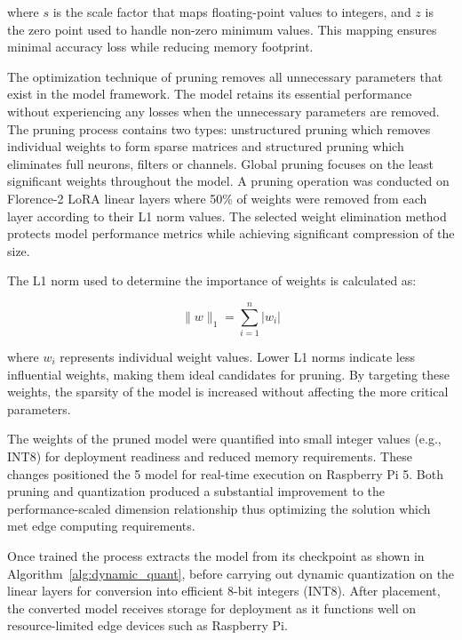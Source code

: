 \documentclass[fleqn,10pt,lineno]{wlpeerj}
\begin{document}
where $s$ is the scale factor that maps floating-point values to integers, and $z$ is the zero point used to handle non-zero minimum values. This mapping ensures minimal accuracy loss while reducing memory footprint.

The optimization technique of pruning removes all unnecessary parameters that exist in the model framework. The model retains its essential performance without experiencing any losses when the unnecessary parameters are removed. The pruning process contains two types: unstructured pruning which removes individual weights to form sparse matrices and structured pruning which eliminates full neurons, filters or channels. Global pruning focuses on the least significant weights throughout the model. 
A pruning operation was conducted on Florence-2 LoRA linear layers where 50\% of weights were removed from each layer according to their L1 norm values. The selected weight elimination method protects model performance metrics while achieving significant compression of the size.

The L1 norm used to determine the importance of weights is calculated as:

\begin{equation}
\| w \|_1 = \sum_{i=1}^{n} |w_i|
\end{equation}


where $w_i$ represents individual weight values. Lower L1 norms indicate less influential weights, making them ideal candidates for pruning. By targeting these weights, the sparsity of the model is increased without affecting the more critical parameters.

The weights of the pruned model were quantified into small integer values (e.g., INT8) for deployment readiness and reduced memory requirements. These changes positioned the 5 model for real-time execution on Raspberry Pi 5. Both pruning and quantization produced a substantial improvement to the performance-scaled dimension relationship thus optimizing the solution which met edge computing requirements.



Once trained the process extracts the model from its checkpoint as shown in Algorithm~\ref{alg:dynamic_quant}, before carrying out dynamic quantization on the linear layers for conversion into efficient 8-bit integers (INT8). After placement, the converted model receives storage for deployment as it functions well on resource-limited edge devices such as Raspberry Pi. 
\end{document}
